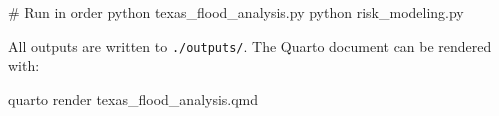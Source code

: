 \documentclass[
  letterpaper,
  DIV=11,
  numbers=noendperiod]{scrartcl}
\newenvironment{Shaded}{\begin{snugshade}}{\end{snugshade}}
\newcommand{\CommentTok}[1]{\textcolor[rgb]{0.37,0.37,0.37}{#1}}
\newcommand{\ExtensionTok}[1]{\textcolor[rgb]{0.00,0.23,0.31}{#1}}
\newcommand{\NormalTok}[1]{\textcolor[rgb]{0.00,0.23,0.31}{#1}}
\begin{document}
\begin{Shaded}
\begin{Highlighting}[]
\CommentTok{\# Run in order}
\ExtensionTok{python}\NormalTok{ texas\_flood\_analysis.py}
\ExtensionTok{python}\NormalTok{ risk\_modeling.py}
\end{Highlighting}
\end{Shaded}

All outputs are written to \texttt{./outputs/}. The Quarto document can
be rendered with:

\begin{Shaded}
\begin{Highlighting}[]
\ExtensionTok{quarto}\NormalTok{ render texas\_flood\_analysis.qmd}
\end{Highlighting}
\end{Shaded}
\end{document}
